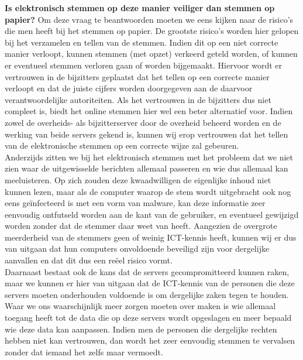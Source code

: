 \documentclass[a4paper,12pt]{article}
\begin{document}
\textbf{Is elektronisch stemmen op deze manier veiliger dan stemmen op papier?}
Om deze vraag te beantwoorden moeten we eens kijken naar de risico's die men
heeft bij het stemmen op papier. De grootste risico's worden hier gelopen
bij het verzamelen en tellen van de stemmen. Indien dit op een niet correcte
manier verloopt, kunnen stemmen (met opzet) verkeerd geteld worden, of kunnen
er eventueel stemmen verloren gaan of worden bijgemaakt. Hiervoor wordt
er vertrouwen in de bijzitters geplaatst dat het tellen op een correcte
manier verloopt en dat de juiste cijfers worden doorgegeven aan de daarvoor
verantwoordelijke autoriteiten. Als het vertrouwen in de bijzitters dus niet
compleet is, biedt het online stemmen hier wel een beter alternatief voor.
Indien zowel de overheids- als bijzitterserver door de overheid beheerd worden
en de werking van beide servers gekend is, kunnen wij erop vertrouwen dat het
tellen van de elektronische stemmen op een correcte wijze zal gebeuren. \\
Anderzijds zitten we bij het elektronisch stemmen met het probleem dat we niet
zien waar de uitgewisselde berichten allemaal passeren en wie dus allemaal
kan meeluisteren. Op zich zouden deze kwaadwilligen de eigenlijke inhoud niet
kunnen lezen, maar als de computer waarop de stem wordt uitgebracht ook nog eens
ge\"infecteerd is met een vorm van malware, kan deze informatie zeer eenvoudig
ontfutseld worden aan de kant van de gebruiker, en eventueel gewijzigd worden
zonder dat de stemmer daar weet van heeft. Aangezien de overgrote meerderheid
van de stemmers geen of weinig ICT-kennis heeft, kunnen wij er dus van uitgaan
dat hun computers onvoldoende beveiligd zijn voor dergelijke aanvallen en dat
dit dus een re\"eel risico vormt. \\ Daarnaast bestaat ook de kans dat de
servers gecompromitteerd kunnen raken, maar we kunnen er hier van uitgaan dat de
ICT-kennis van de personen die deze servers moeten onderhouden voldoende is om
dergelijke zaken tegen te houden. Waar we ons waarschijnlijk meer zorgen moeten
over maken is wie allemaal toegang heeft tot de data die op deze servers wordt
opgeslagen en meer bepaald wie deze data kan aanpassen. Indien men de personen
die dergelijke rechten hebben niet kan vertrouwen, dan wordt het zeer eenvoudig
stemmen te vervalsen zonder dat iemand het zelfs maar vermoedt.
\end{document}
